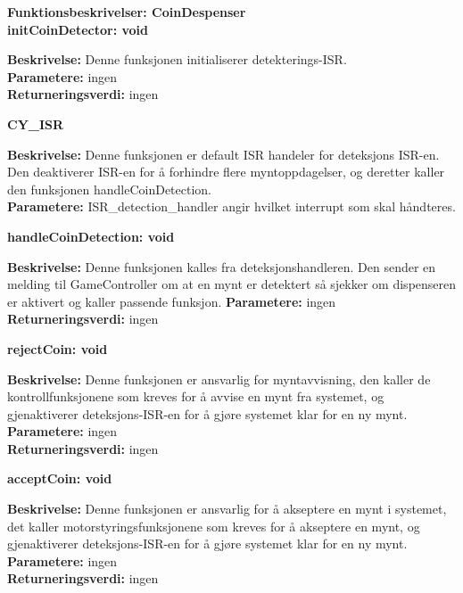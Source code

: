 {\large\textbf{Funktionsbeskrivelser: CoinDespenser}}\\[0.2cm]

\textbf {initCoinDetector: void}
\begin{adjustwidth}{1cm}{0pt}
\textbf {Beskrivelse:} Denne funksjonen initialiserer detekterings-ISR. \\ [0.2cm]
\textbf {Parametere:} ingen \\ [0.2cm]
\textbf {Returneringsverdi:} ingen \\ [0.2cm]
\end{adjustwidth}

\textbf {CY\_ISR}
\begin{adjustwidth}{1cm}{0pt}
\textbf {Beskrivelse:} Denne funksjonen er default ISR handeler for deteksjons ISR-en. Den deaktiverer ISR-en for å forhindre flere myntoppdagelser, og deretter kaller den funksjonen handleCoinDetection. \\ [0.2cm]
\textbf {Parametere:} ISR\_detection\_handler angir hvilket interrupt som skal håndteres. \\ [0.2cm]
\end{adjustwidth}

\textbf {handleCoinDetection: void}
\begin{adjustwidth}{1cm}{0pt}
\textbf {Beskrivelse:} Denne funksjonen kalles fra deteksjonshandleren. Den sender en melding til GameController om at en mynt er detektert så sjekker om dispenseren er aktivert og kaller passende funksjon.
\textbf {Parametere:} ingen \\ [0.2cm]
\textbf {Returneringsverdi:} ingen \\ [0.2cm]
\end{adjustwidth}

\textbf {rejectCoin: void}
\begin{adjustwidth}{1cm}{0pt}
\textbf {Beskrivelse:} Denne funksjonen er ansvarlig for myntavvisning, den kaller de kontrollfunksjonene som kreves for å avvise en mynt fra systemet, og gjenaktiverer deteksjons-ISR-en for å gjøre systemet klar for en ny mynt. \\ [0.2cm]
\textbf {Parametere:} ingen \\ [0.2cm]
\textbf {Returneringsverdi:} ingen \\ [0.2cm]
\end{adjustwidth}

\textbf {acceptCoin: void}
\begin{adjustwidth}{1cm}{0pt}
\textbf {Beskrivelse:} Denne funksjonen er ansvarlig for å akseptere en mynt i systemet, det kaller motorstyringsfunksjonene som kreves for å akseptere en mynt, og gjenaktiverer deteksjons-ISR-en for å gjøre systemet klar for en ny mynt. \\ [0.2cm]
\textbf {Parametere:} ingen \\ [0.2cm]
\textbf {Returneringsverdi:} ingen \\ [0.2cm]
\end{adjustwidth}

